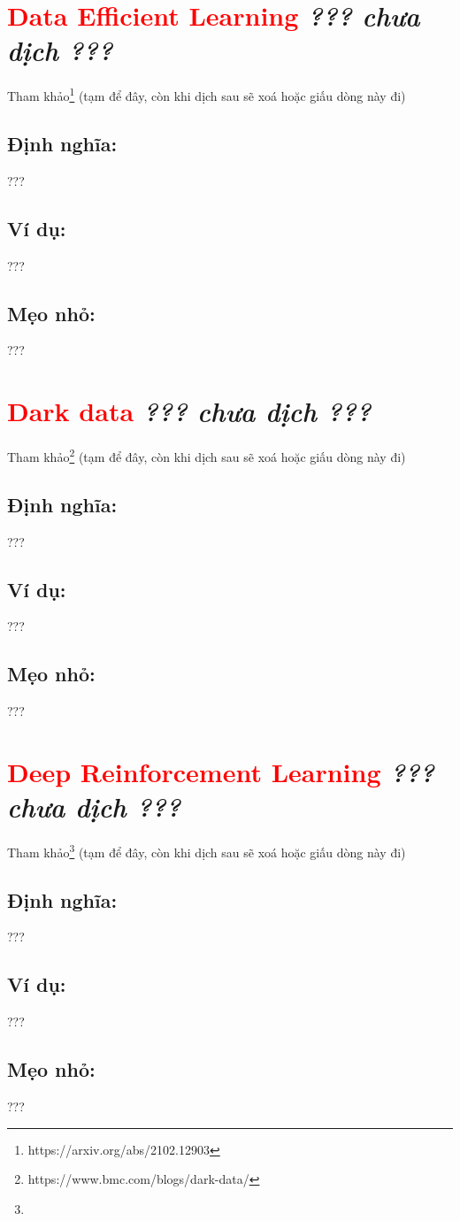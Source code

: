 \section*{\huge \textcolor{Red}{Data Efficient Learning}  \small \textit{??? chưa dịch ???} }
Tham khảo\footnote{https://arxiv.org/abs/2102.12903} (tạm để đây, còn khi dịch sau sẽ xoá hoặc giấu dòng này đi)
\subsection*{Định nghĩa:}
???
\subsection*{Ví dụ:}
???
\subsection*{Mẹo nhỏ:}
???
\section*{\huge \textcolor{Red}{Dark data}  \small \textit{??? chưa dịch ???} }
Tham khảo\footnote{https://www.bmc.com/blogs/dark-data/} (tạm để đây, còn khi dịch sau sẽ xoá hoặc giấu dòng này đi)
\subsection*{Định nghĩa:}
???
\subsection*{Ví dụ:}
???
\subsection*{Mẹo nhỏ:}
???
\section*{\huge \textcolor{Red}{Deep Reinforcement Learning}  \small \textit{??? chưa dịch ???} }
Tham khảo\footnote{} (tạm để đây, còn khi dịch sau sẽ xoá hoặc giấu dòng này đi)
\subsection*{Định nghĩa:}
???
\subsection*{Ví dụ:}
???
\subsection*{Mẹo nhỏ:}
???
